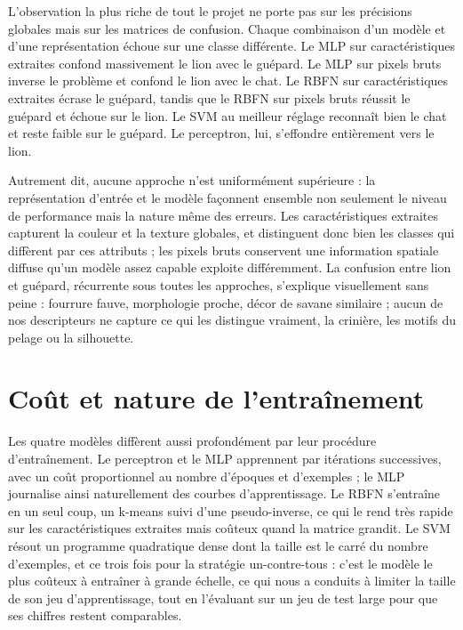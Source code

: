 \documentclass[11pt,a4paper]{report}
\begin{document}
L'observation la plus riche de tout le projet ne porte pas sur les
précisions globales mais sur les matrices de confusion. Chaque
combinaison d'un modèle et d'une représentation échoue sur une classe
différente. Le MLP sur caractéristiques extraites confond massivement le
lion avec le guépard. Le MLP sur pixels bruts inverse le problème et
confond le lion avec le chat. Le RBFN sur caractéristiques extraites
écrase le guépard, tandis que le RBFN sur pixels bruts réussit le
guépard et échoue sur le lion. Le SVM au meilleur réglage reconnaît bien
le chat et reste faible sur le guépard. Le perceptron, lui, s'effondre
entièrement vers le lion.

Autrement dit, aucune approche n'est uniformément supérieure : la
représentation d'entrée et le modèle façonnent ensemble non seulement le
niveau de performance mais la nature même des erreurs. Les
caractéristiques extraites capturent la couleur et la texture globales,
et distinguent donc bien les classes qui diffèrent par ces attributs ;
les pixels bruts conservent une information spatiale diffuse qu'un
modèle assez capable exploite différemment. La confusion entre lion et
guépard, récurrente sous toutes les approches, s'explique visuellement
sans peine : fourrure fauve, morphologie proche, décor de savane
similaire ; aucun de nos descripteurs ne capture ce qui les distingue
vraiment, la crinière, les motifs du pelage ou la silhouette.

\hypertarget{couxfbt-et-nature-de-lentrauxeenement}{%
\section{Coût et nature de
l'entraînement}\label{couxfbt-et-nature-de-lentrauxeenement}}

Les quatre modèles diffèrent aussi profondément par leur procédure
d'entraînement. Le perceptron et le MLP apprennent par itérations
successives, avec un coût proportionnel au nombre d'époques et
d'exemples ; le MLP journalise ainsi naturellement des courbes
d'apprentissage. Le RBFN s'entraîne en un seul coup, un k-means suivi
d'une pseudo-inverse, ce qui le rend très rapide sur les
caractéristiques extraites mais coûteux quand la matrice grandit. Le SVM
résout un programme quadratique dense dont la taille est le carré du
nombre d'exemples, et ce trois fois pour la stratégie un-contre-tous :
c'est le modèle le plus coûteux à entraîner à grande échelle, ce qui
nous a conduits à limiter la taille de son jeu d'apprentissage, tout en
l'évaluant sur un jeu de test large pour que ses chiffres restent
comparables.
\end{document}
